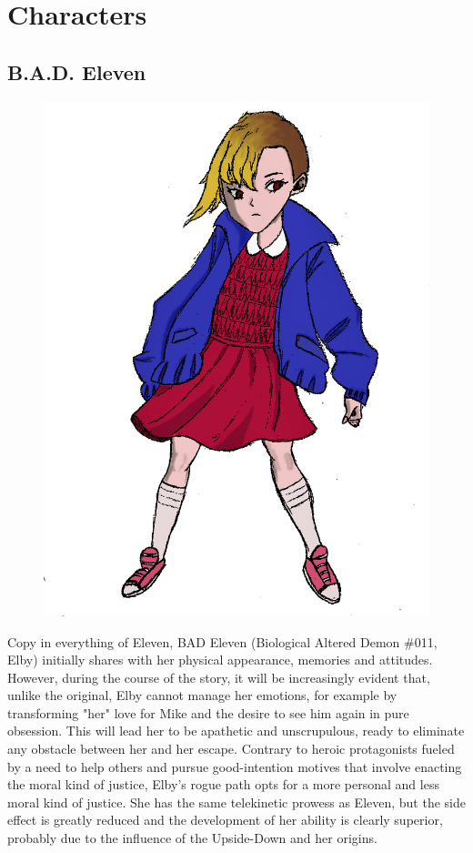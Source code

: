 \section{Characters}

\subsection{B.A.D. Eleven}

\begin{figure}
	\centering
	\includegraphics[width=0.5\linewidth]{images/characters/bad_eleven.png}
\end{figure}

Copy in everything of Eleven, BAD Eleven (Biological Altered Demon \#011, Elby) initially shares with her physical appearance, memories and attitudes. However, during the course of the story, it will be increasingly evident that, unlike the original, Elby cannot manage her emotions, for example by transforming "her" love for Mike and the desire to see him again in pure obsession. This will lead her to be apathetic and unscrupulous, ready to eliminate any obstacle between her and her escape. Contrary to heroic protagonists fueled by a need to help others and pursue good-intention motives that involve enacting the moral kind of justice, Elby's rogue path opts for a more personal and less moral kind of justice. She has the same telekinetic prowess as Eleven, but the side effect is greatly reduced and the development of her ability is clearly superior, probably due to the influence of the Upside-Down and her origins.

\vspace*{0.5cm}

